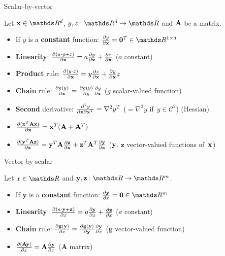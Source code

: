 \documentclass[11pt,compress,t,notes=noshow, xcolor=table]{beamer}
\begin{document}
\begin{vbframe}{Scalar-by-vector}

Let $\xv \in \R^d$, $y,z : \R^d \to \R$ and $\mathbf{A}$ be a matrix.

\medskip

\begin{itemize}
    \item If $y$ is a \textbf{constant} function: $\frac{\partial y}{\partial\xv} = \mathbf{0}^T \in \R^{1\times d}$
    \item \textbf{Linearity}: $\frac{\partial (a \cdot y + z)}{\partial\mathbf{x}} = a\frac{\partial y}{\partial\mathbf{x}} + \frac{\partial z}{\partial\mathbf{x}}$ \quad ($a$ constant)
    \item \textbf{Product} rule: $\frac{\partial (y \cdot z)}{\partial\mathbf{x}} = y \frac{\partial z}{\partial\mathbf{x}} + \frac{\partial y}{\partial \mathbf{x}}z$
    \item \textbf{Chain} rule: $\frac{\partial g(y)}{\partial\mathbf{x}} = \frac{\partial g(y)}{\partial y}\frac{\partial y}{\partial \mathbf{x}}$ \quad ($g$ scalar-valued function)
    \item \textbf{Second} derivative: $\frac{\partial^2 y}{\partial\mathbf{x} \partial\mathbf{x}^T} = \nabla^2 y^T$ ($=\nabla^2 y$ if~$y\in\mathcal{C}^2$) (Hessian)
    \item $\frac{\partial(\mathbf{x}^T\mathbf{A}\mathbf{x})}{\partial\mathbf{x}} =  \mathbf{x}^T(\mathbf{A}+\mathbf{A}^T)$
    \item $\frac{\partial(\mathbf{y}^T \mathbf{A} \mathbf{z})}{\partial\mathbf{x}} = \mathbf{y}^T \mathbf{A} \frac{\partial\mathbf{z}}{\partial\mathbf{x}} + \mathbf{z}^T \mathbf{A}^T \frac{\partial\mathbf{y}}{\partial\mathbf{x}}$ \quad ($\mathbf{y}$, $\mathbf{z}$ vector-valued functions of~$\mathbf{x}$)
\end{itemize}

\end{vbframe}

\begin{vbframe}{Vector-by-scalar}

Let $x \in \R$ and $\yv, \mathbf{z} : \R \to \R^m$.

\medskip

\begin{itemize}
    \item If $\mathbf{y}$ is a \textbf{constant} function: $\frac{\partial \mathbf{y}}{\partial x} = \mathbf{0} \in \R^{m}$
    \item \textbf{Linearity}: $\frac{\partial (a \cdot \mathbf{y} + \mathbf{z})}{\partial x} = a \frac{\partial\mathbf{y}}{\partial x} + \frac{\partial \mathbf{z}}{\partial x}$ \quad ($a$ constant)
    \item \textbf{Chain} rule: $\frac{\partial\mathbf{g}(\mathbf{y})}{\partial x} = \frac{\partial\mathbf{g}(\mathbf{y})}{\partial\mathbf{y}}\frac{\partial \mathbf{y}}{\partial x}$ \quad ($\mathbf{g}$ vector-valued function)
    \item $\frac{\partial(\mathbf{A}\mathbf{y})}{\partial x} = \mathbf{A}\frac{\partial\mathbf{y}}{\partial x}$  \quad ($\mathbf{A}$ matrix)
\end{itemize}
\end{vbframe}
\end{document}
